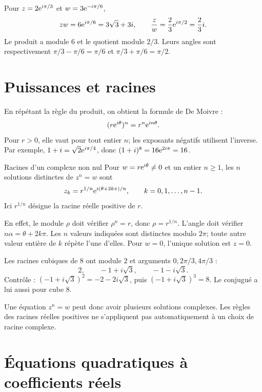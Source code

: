 \begin{examplebox}
Pour $z=2\mathrm{e}^{i\pi/3}$ et $w=3\mathrm{e}^{-i\pi/6}$,
\[
zw=6\mathrm{e}^{i\pi/6}=3\sqrt3+3i,
\qquad \frac zw=\frac23\mathrm{e}^{i\pi/2}=\frac23i.
\]
Le produit a module $6$ et le quotient module $2/3$. Leurs angles sont respectivement $\pi/3-\pi/6=\pi/6$ et $\pi/3+\pi/6=\pi/2$.
\end{examplebox}

\section{Puissances et racines}
\label{manual:section:complexes.07}

En répétant la règle du produit, on obtient la formule de De Moivre :
\[
(r\mathrm{e}^{i\theta})^n=r^n\mathrm{e}^{in\theta}.
\]
Pour $r>0$, elle vaut pour tout entier $n$; les exposants négatifs utilisent l'inverse. Par exemple, $1+i=\sqrt2\mathrm{e}^{i\pi/4}$, donc $(1+i)^8=16\mathrm{e}^{2i\pi}=16$.

\begin{proposition}{Racines d'un complexe non nul}{}
Pour $w=r\mathrm{e}^{i\theta}\ne0$ et un entier $n\ge1$, les $n$ solutions distinctes de $z^n=w$ sont
\[
z_k=r^{1/n}\mathrm{e}^{i(\theta+2k\pi)/n},\qquad k=0,1,\ldots,n-1.
\]
Ici $r^{1/n}$ désigne la racine réelle positive de $r$.
\end{proposition}

En effet, le module $\rho$ doit vérifier $\rho^n=r$, donc $\rho=r^{1/n}$. L'angle doit vérifier $n\alpha=\theta+2k\pi$. Les $n$ valeurs indiquées sont distinctes modulo $2\pi$; toute autre valeur entière de $k$ répète l'une d'elles. Pour $w=0$, l'unique solution est $z=0$.

\begin{examplebox}
Les racines cubiques de $8$ ont module $2$ et arguments $0,2\pi/3,4\pi/3$ :
\[
2,\qquad -1+i\sqrt3,\qquad -1-i\sqrt3.
\]
Contrôle : $(-1+i\sqrt3)^2=-2-2i\sqrt3$, puis $(-1+i\sqrt3)^3=8$. Le conjugué a lui aussi pour cube $8$.
\end{examplebox}

Une équation $z^n=w$ peut donc avoir plusieurs solutions complexes. Les règles des racines réelles positives ne s'appliquent pas automatiquement à un choix de racine complexe.

\section{Équations quadratiques à coefficients réels}
\label{manual:section:complexes.08}

